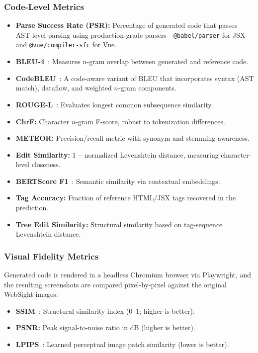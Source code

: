 \subsubsection{Code-Level Metrics}
\begin{itemize}
    \item \textbf{Parse Success Rate (PSR):} Percentage of generated code that passes AST-level parsing using production-grade parsers—\texttt{@babel/parser} for JSX and \texttt{@vue/compiler-sfc} for Vue.
    \item \textbf{BLEU-4}~\cite{papineni2002bleu}: Measures $n$-gram overlap between generated and reference code.
    \item \textbf{CodeBLEU}~\cite{ren2020codebleu}: A code-aware variant of BLEU that incorporates syntax (AST match), dataflow, and weighted $n$-gram components.
    \item \textbf{ROUGE-L}~\cite{lin2004rouge}: Evaluates longest common subsequence similarity.
    \item \textbf{ChrF:} Character $n$-gram F-score, robust to tokenization differences.
    \item \textbf{METEOR:} Precision/recall metric with synonym and stemming awareness.
    \item \textbf{Edit Similarity:} $1 - \text{normalized Levenshtein distance}$, measuring character-level closeness.
    \item \textbf{BERTScore F1}~\cite{zhang2019bertscore}: Semantic similarity via contextual embeddings.
    \item \textbf{Tag Accuracy:} Fraction of reference HTML/JSX tags recovered in the prediction.
    \item \textbf{Tree Edit Similarity:} Structural similarity based on tag-sequence Levenshtein distance.
\end{itemize}

\subsubsection{Visual Fidelity Metrics}
Generated code is rendered in a headless Chromium browser via Playwright, and the resulting screenshots are compared pixel-by-pixel against the original WebSight images:
\begin{itemize}
    \item \textbf{SSIM}~\cite{wang2004ssim}: Structural similarity index ($0$--$1$; higher is better).
    \item \textbf{PSNR:} Peak signal-to-noise ratio in dB (higher is better).
    \item \textbf{LPIPS}~\cite{zhang2018lpips}: Learned perceptual image patch similarity (lower is better).
\end{itemize}

